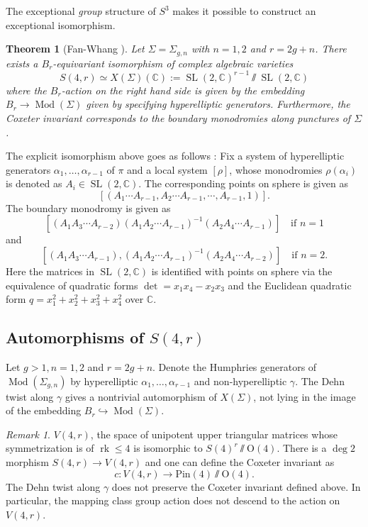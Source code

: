 \documentclass[11pt]{amsart}
\newtheorem{theorem}{Theorem}
\numberwithin{theorem}{section}
\theoremstyle{definition}
\theoremstyle{remark}
\newtheorem*{remark}{Remark}
\newcommand{\C}{{\mathbb{C}}}
\DeclareMathOperator{\Mod}{Mod}
\DeclareMathOperator{\rk}{rk}
\DeclareMathOperator{\SL}{SL}
\newcommand{\<}{\langle}
\renewcommand{\>}{\rangle}
\begin{document}
The exceptional \textit{group} structure of $S^3$ makes it possible to construct an exceptional isomorphism.

\begin{theorem}[Fan-Whang \cite{fan2020surfaces}]
    Let $\Sigma = \Sigma_{g, n}$ with $n = 1, 2$ and $r = 2g + n$. There exists a $B_r$-equivariant isomorphism of complex algebraic varieties
    \[
    S(4, r) \simeq X(\Sigma)(\C) := \SL(2, \C)^{r-1} \sslash \SL(2, \C)
    \]
    where the $B_r$-action on the right hand side is given by the embedding $B_r \rightarrow \Mod(\Sigma)$ given by specifying hyperelliptic generators. Furthermore, the Coxeter invariant corresponds to the boundary monodromies along punctures of $\Sigma$.
\end{theorem}

The explicit isomorphism above goes as follows : Fix a system of hyperelliptic generators $\alpha_1, \ldots, \alpha_{r-1}$ of $\pi$ and a local system $[\rho]$, whose monodromies $\rho(\alpha_i)$ is denoted as $A_i \in \SL(2, \C)$. The corresponding points on sphere is given as
\[
[\left( A_1 \cdots A_{r-1}, A_2 \cdots A_{r-1}, \cdots, A_{r-1}, 1 \right)].
\]
The boundary monodromy is given as
\[
[(A_1 A_3 \cdots A_{r-2}) (A_1 A_2 \cdots A_{r-1})^{-1} (A_2 A_4 \cdots A_{r-1})] \quad \text{if } n=1
\]
and
\[
[(A_1 A_3 \cdots A_{r-1}), (A_1 A_2 \cdots A_{r-1})^{-1} (A_2 A_4 \cdots A_{r-2})] \quad \text{if } n=2.
\]
Here the matrices in $\SL(2, \C)$ is identified with points on sphere via the equivalence of quadratic forms $\det = x_1x_4 - x_2x_3$ and the Euclidean quadratic form $q = x_1^2 + x_2^2 + x_3^2 + x_4^2$ over $\C$.

\subsection{Automorphisms of $S(4, r)$}

Let $g > 1, n= 1, 2$ and $r = 2g + n$. Denote the Humphries generators of $\Mod(\Sigma_{g, n})$ by hyperelliptic $\alpha_1, \ldots, \alpha_{r-1}$ and non-hyperelliptic $\gamma$. The Dehn twist along $\gamma$ gives a nontrivial automorphism of $X(\Sigma)$, not lying in the image of the embedding $B_r \hookrightarrow \Mod(\Sigma)$. 

\begin{remark}
    $V(4, r)$, the space of unipotent upper triangular matrices whose symmetrization is of $\rk \leq 4$ is isomorphic to $S(4)^r \sslash \mathrm{O}(4)$. There is a $\deg 2$ morphism $S(4, r) \rightarrow V(4, r)$ and one can define the Coxeter invariant as
    \[
    c : V(4, r) \rightarrow \mathrm{Pin}(4) \sslash \mathrm{O}(4).
    \]
    The Dehn twist along $\gamma$ does not preserve the Coxeter invariant defined above. In particular, the mapping class group action does not descend to the action on $V(4, r)$.
\end{remark}
\end{document}
